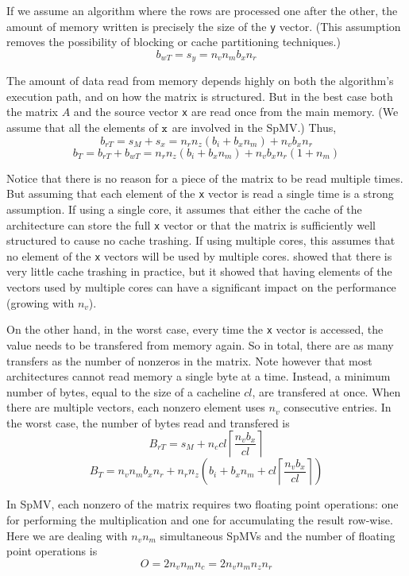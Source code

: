 \documentclass[10pt,conference,compsocconf]{IEEEtran}
\newcommand{\ceil}[1]{\left\lceil#1\right\rceil}
\begin{document}
If we assume an algorithm where the rows are processed one after
the other, the amount of memory written is precisely the
size of the {\tt y} vector. (This assumption removes the possibility of
blocking or cache partitioning techniques.) $$b_{wT} = s_y = n_v n_m b_x n_r$$

The amount of data read from memory depends highly on both the
algorithm's execution path, and on how the matrix is structured. But
in the best case both the matrix $A$ and the source vector {\tt x} are
read once from the main memory. (We assume that all the elements of
$\tt x$ are involved in the SpMV.)  Thus, $$b_{rT} = s_M + s_x = n_r
n_z (b_i + b_x n_m) + n_v b_x n_r$$
 $$b_T = b_{rT} + b_{wT} =  n_r n_z (b_i + b_x n_m) + n_v b_x n_r (1 + n_m)$$

Notice that there is no reason for a piece of the matrix to be read
multiple times. But assuming that each element of the {\tt x} vector
is read a single time is a strong assumption. If using a single core,
it assumes that either the cache of the architecture can store the full
{\tt x} vector or that the matrix is sufficiently well structured 
to cause no cache trashing. If using multiple cores, this assumes that
no element of the {\tt x} vectors will be used by multiple
cores. \cite{Saule13-ARXIV} showed that there is very little cache trashing
in practice, but it showed that having elements of the vectors used by
multiple cores can have a significant impact on the performance
(growing with $n_v$).

On the other hand, in the worst case, every time the {\tt x} vector is
accessed, the value needs to be transfered from memory again. So in
total, there are as many transfers as the number of nonzeros in the
matrix. Note however that most architectures cannot read memory a
single byte at a time. Instead, a minimum number of bytes, equal to
the size of a cacheline $cl$, are transfered at once.  When there are
multiple vectors, each nonzero element uses $n_v$ consecutive
entries. In the worst case, the number of bytes read and transfered is
$$B_{rT} = s_M + n_c cl \ceil{\frac{n_vb_x}{cl}} $$ 
$$B_T = n_v n_m b_x n_r + n_r n_z \left ( b_i + b_x n_m +  cl \ceil{\frac{n_vb_x}{cl}} \right)$$

In SpMV, each nonzero of the matrix requires two floating point
operations: one for performing the multiplication and one for
accumulating the result row-wise. Here we are dealing with $n_v n_m$
simultaneous SpMVs and the number of floating point operations is
$$O = 2 n_v n_m n_c = 2 n_v n_m n_z n_r$$
\end{document}
